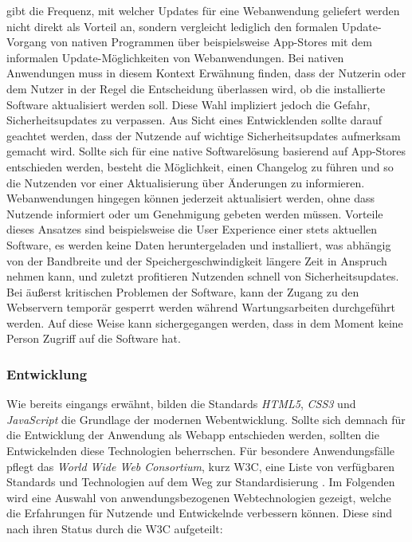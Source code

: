 \documentclass[a4paper]{scrartcl}
\begin{document}
\textcite[28]{Jobe} gibt die Frequenz, mit welcher Updates für eine Webanwendung geliefert werden nicht direkt als Vorteil an, sondern vergleicht lediglich den formalen Update-Vorgang von nativen Programmen über beispielsweise App-Stores mit dem informalen Update-Möglichkeiten von Webanwendungen. Bei nativen Anwendungen muss in diesem Kontext Erwähnung finden, dass der Nutzerin oder dem Nutzer in der Regel die Entscheidung überlassen wird, ob die installierte Software aktualisiert werden soll. Diese Wahl impliziert jedoch die Gefahr, Sicherheitsupdates zu verpassen. Aus Sicht eines Entwicklenden sollte darauf geachtet werden, dass der Nutzende auf wichtige Sicherheitsupdates aufmerksam gemacht wird. Sollte sich für eine native Softwarelösung basierend auf App-Stores entschieden werden, besteht die Möglichkeit, einen Changelog zu führen und so die Nutzenden vor einer Aktualisierung über Änderungen zu informieren. \\
Webanwendungen hingegen können jederzeit aktualisiert werden, ohne dass Nutzende informiert oder um Genehmigung gebeten werden müssen. Vorteile dieses Ansatzes sind beispielsweise die User Experience einer stets aktuellen Software, es werden keine Daten heruntergeladen und installiert, was abhängig von der Bandbreite und der Speichergeschwindigkeit längere Zeit in Anspruch nehmen kann, und zuletzt profitieren Nutzenden schnell von Sicherheitsupdates. Bei äußerst kritischen Problemen der Software, kann der Zugang zu den Webservern temporär gesperrt werden während Wartungsarbeiten durchgeführt werden. Auf diese Weise kann sichergegangen werden, dass in dem Moment keine Person Zugriff auf die Software hat.

\subsubsection{Entwicklung}

Wie bereits eingangs erwähnt, bilden die Standards \textit{HTML5}, \textit{CSS3} und \textit{JavaScript} die Grundlage der modernen Webentwicklung. Sollte sich demnach für die Entwicklung der Anwendung als Webapp entschieden werden, sollten die Entwickelnden diese Technologien beherrschen. Für besondere Anwendungsfälle pflegt das \textit{World Wide Web Consortium}, kurz W3C, eine Liste von verfügbaren Standards und Technologien auf dem Weg zur Standardisierung \autocite{W3C}. Im Folgenden wird eine Auswahl von anwendungsbezogenen Webtechnologien gezeigt, welche die Erfahrungen für Nutzende und Entwickelnde verbessern können. Diese sind nach ihren Status durch die W3C aufgeteilt:
\end{document}
